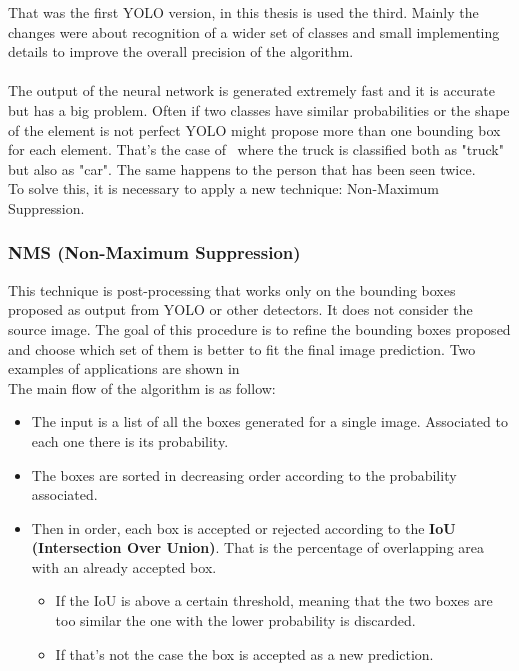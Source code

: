 That was the first YOLO version, in this thesis is used the third\cite{yoloV3}. Mainly the changes were about recognition of a wider set of classes and small implementing details to improve the overall precision of the algorithm.\\
\\
The output of the neural network is generated extremely fast and it is accurate but has a big problem. Often if two classes have similar probabilities or the shape of the element is not perfect YOLO might propose more than one bounding box for each element. That's the case of~ where the truck is classified both as "truck" but also as "car". The same happens to the person that has been seen twice.\\
To solve this, it is necessary to apply a new technique: Non-Maximum Suppression.

\subsubsection*{NMS (Non-Maximum Suppression)}
This technique\cite{nms} is post-processing that works only on the bounding boxes proposed as output from YOLO or other detectors. It does not consider the source image. The goal of this procedure is to refine the bounding boxes proposed and choose which set of them is better to fit the final image prediction. Two examples of applications are shown in~\\
The main flow of the algorithm is as follow:
\begin{itemize}
	\item The input is a list of all the boxes generated for a single image. Associated to each one there is its probability.
	\item The boxes are sorted in decreasing order according to the probability associated.
	\item Then in order, each box is accepted or rejected according to the \textbf{IoU (Intersection Over Union)}. That is the percentage of overlapping area with an already accepted box.
	\begin{itemize}
		\item If the IoU is above a certain threshold, meaning that the two boxes are too similar the one with the lower probability is discarded.
		\item If that's not the case the box is accepted as a new prediction.
	\end{itemize}
\end{itemize}

